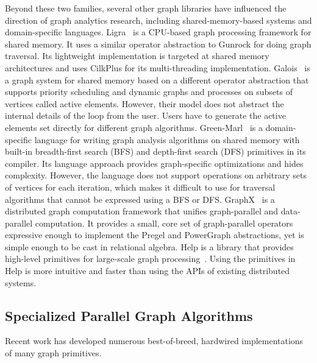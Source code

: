 \documentclass[format=acmsmall,review=false,screen=true]{acmart}
\begin{document}
Beyond these two families, several other graph libraries have
influenced the direction of graph analytics research, including
shared-memory-based systems and domain-specific languages.
Ligra~\cite{Shun:2013:LAL} is a CPU-based graph processing framework
for shared memory. It uses a similar operator
abstraction to Gunrock for doing graph traversal. Its lightweight
implementation is targeted at shared memory architectures and uses
CilkPlus for its multi-threading implementation.
Galois~\cite{Pingali:2011:TTO,Nguyen:2013:ALI} is a graph system for
shared memory based on a different operator abstraction that supports
priority scheduling and dynamic graphs and processes on subsets of
vertices called active elements. However, their model does not
abstract the internal details of the loop from the user. Users have to
generate the active elements set directly for different graph
algorithms.
Green-Marl~\cite{Hong:2012:GDE} is a domain-specific language for
writing graph analysis algorithms on shared memory with built-in
breadth-first search (BFS) and depth-first search (DFS) primitives in
its compiler. Its language approach provides graph-specific
optimizations and hides complexity. However, the language does not
support operations on arbitrary sets of vertices for each iteration,
which makes it difficult to use for traversal algorithms that cannot
be expressed using a BFS or DFS\@.
GraphX~\cite{Gonzalez:2014:GGP} is a distributed graph computation
framework that unifies graph-parallel and data-parallel computation.
It provides a small, core set of graph-parallel operators expressive
enough to implement the Pregel and PowerGraph abstractions, yet is
simple enough to be cast in relational algebra.
Help is a library that provides high-level primitives for large-scale
graph processing~\cite{Salihoglu:2014:HHP}. Using the primitives in
Help is more intuitive and faster than using the APIs of existing
distributed systems.

\subsection{Specialized Parallel Graph Algorithms}
\label{subsec:gpu1}
Recent work has developed numerous best-of-breed, hardwired
implementations of many graph primitives.
\end{document}
